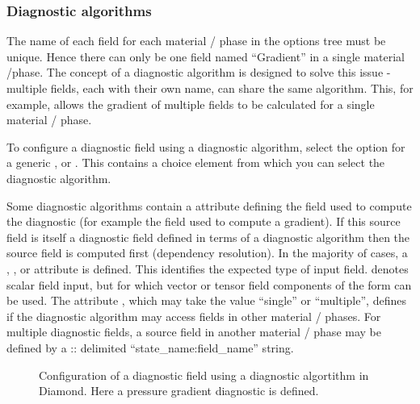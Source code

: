 \subsubsection{Diagnostic algorithms}

The name of each field for each material / phase  in the options tree must be
unique. Hence there can only be one field named ``Gradient'' in a single
material /phase. The concept of a diagnostic algorithm is designed to solve this
issue - multiple fields, each with their own name, can share the same algorithm.
This, for example, allows the gradient of multiple fields to be calculated for a
single material / phase.

To configure a diagnostic field using a diagnostic algorithm, select the
 option for a generic , 
or . This contains a 
choice element from which you can select the diagnostic algorithm.

Some diagnostic algorithms contain a 
attribute defining the field used to compute the diagnostic (for example the
field used to compute a gradient). If this source field is itself a diagnostic
field defined in terms of a diagnostic algorithm then the source field is
computed first (dependency resolution).
In the majority of cases, a , , 
or  attribute is defined. This identifies the
expected type of input field.  denotes scalar field
input, but for which vector or tensor field components of the form 
can be used.
The attribute , which may take the
value ``single'' or ``multiple'', defines if the diagnostic algorithm may
access fields in other material / phases. For multiple 
diagnostic fields, a source field in another material / phase
may be defined by a :: delimited ``state\_name\::field\_name'' string.

\begin{figure}[ht]
  \centering
  \caption{Configuration of a diagnostic field using a diagnostic algortithm in
           Diamond. Here a pressure gradient diagnostic is defined.}
  \label{fig:diagnostic_algorithm}
\end{figure}

